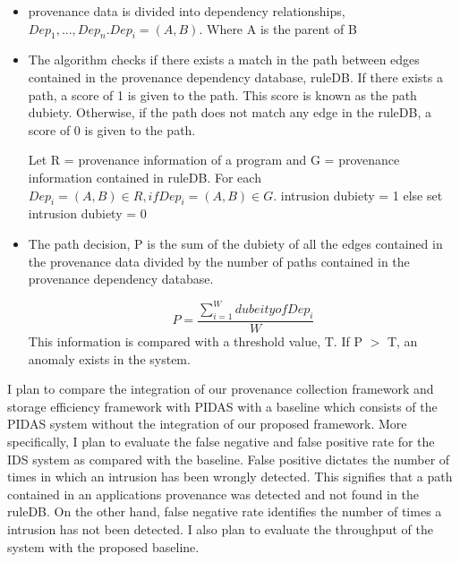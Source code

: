 \begin{itemize}

\item provenance data is divided into dependency relationships, $Dep_1,...,Dep_n. Dep_i =(A, B)$. Where A is the parent of B

\item The algorithm checks if there exists a match in the path between edges contained in the provenance dependency database, ruleDB. If there exists a path, a score of 1 is given to the path. This score is known as the path dubiety. Otherwise, if the path does not match any edge in the ruleDB, a score of 0 is given to the path.

Let R = provenance information of a program and G = provenance information contained in ruleDB. For each $Dep_i = (A, B) \in R, if Dep_i = (A, B) \in G$. intrusion dubiety = 1 else set intrusion dubiety = 0

\item The path decision, P is the sum of the dubiety of all the edges contained in the provenance data divided by the number of paths contained in the provenance dependency database.

 \[P =\frac{\sum\limits_{i=1}^W dubeity of Dep_i }{W} \] This information is compared with a threshold value, T. If P $>$ T, an anomaly exists in the system.

\end{itemize}

I plan to compare the integration of our provenance collection framework and storage efficiency framework with PIDAS with a baseline which consists of the PIDAS system without the integration of our proposed framework. More specifically, I plan to evaluate the false negative and false positive rate for the IDS system as compared with the baseline. False positive dictates the number of times in which an intrusion has been wrongly detected. This signifies that a path contained in an applications provenance was detected and not found in the ruleDB. On the other hand, false negative rate identifies the number of times a intrusion has not been detected. I also plan to evaluate the throughput of the system with the proposed baseline.





%
